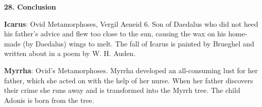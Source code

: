 \documentclass{scrartcl}
\begin{document}
\begin{multicols*}{3}
{\bf 28. Conclusion}

{\bf Icarus}: Ovid Metamorphoses, Vergil Aeneid 6. Son of Daedalus who did not heed his father's advice and flew too close to the sun, causing the wax on his home-made (by Daedalus) wings to melt. The fall of Icarus is painted by Brueghel and written about in a poem by W. H. Auden.

{\bf Myrrha}: Ovid's Metamorphoses. Myrrha developed an all-consuming lust for her father, which she acted on with the help of her nurse. When her father discovers their crime she runs away and is transformed into the Myrrh tree. The child Adonis is born from the tree.



\end{multicols*}
\end{document}
